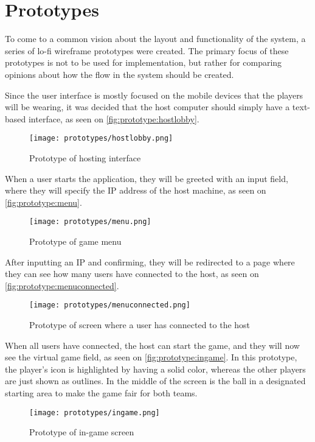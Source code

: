 \section{Prototypes}
To come to a common vision about the layout and functionality of the system, a series of lo-fi wireframe prototypes were created.
The primary focus of these prototypes is not to be used for implementation, but rather for comparing opinions about how the flow in the system should be created.

Since the user interface is mostly focused on the mobile devices that the players will be wearing, it was decided that the host computer should simply have a text-based interface, as seen on \autoref{fig:prototype:hostlobby}.

\begin{figure}[H]
    \centering
    \texttt{[image: prototypes/hostlobby.png]}
    \caption{Prototype of hosting interface}
    \label{fig:prototype:hostlobby}
\end{figure}

When a user starts the application, they will be greeted with an input field, where they will specify the IP address of the host machine, as seen on \autoref{fig:prototype:menu}. 

\begin{figure}[H]
    \centering
    \texttt{[image: prototypes/menu.png]}
    \caption{Prototype of game menu}
    \label{fig:prototype:menu}
\end{figure}

After inputting an IP and confirming, they will be redirected to a page where they can see how many users have connected to the host, as seen on \autoref{fig:prototype:menuconnected}. 

\begin{figure}[H]
    \centering
    \texttt{[image: prototypes/menuconnected.png]}
    \caption{Prototype of screen where a user has connected to the host}
    \label{fig:prototype:menuconnected}
\end{figure}

When all users have connected, the host can start the game, and they will now see the virtual game field, as seen on \autoref{fig:prototype:ingame}.
In this prototype, the player's icon is highlighted by having a solid color, whereas the other players are just shown as outlines.
In the middle of the screen is the ball in a designated starting area to make the game fair for both teams.

\begin{figure}[H]
    \centering
    \texttt{[image: prototypes/ingame.png]}
    \caption{Prototype of in-game screen}
    \label{fig:prototype:ingame}
\end{figure}
